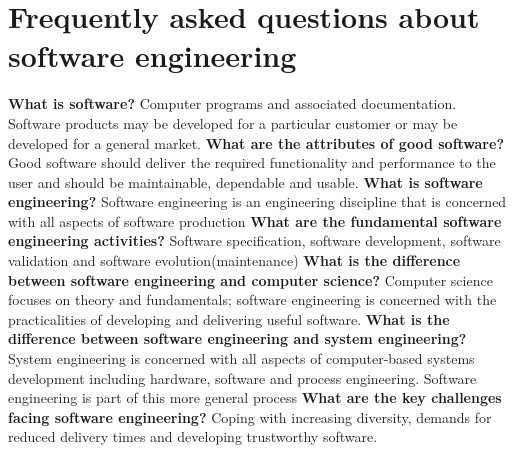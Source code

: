 \documentclass{report}
\begin{document}
\newpage
\section{Frequently asked questions about software engineering}
\textbf{What is software?}\newline
  Computer programs and associated documentation. Software products may be developed for a particular customer or may be developed for a general market.
\newline\newline
\textbf{What are the attributes of good software?}\newline
  Good software should deliver the required functionality and performance to the user and should be maintainable, dependable and usable.
\newline\newline
\textbf{What is software engineering?}\newline
Software engineering is an engineering discipline that is
concerned with all aspects of software production
\newline\newline
\textbf{What are the fundamental software engineering activities?}\newline
Software specification, software development, software
validation and software evolution(maintenance)
\newline\newline
\textbf{What is the difference between software engineering and computer science?}\newline
Computer science focuses on theory and fundamentals; software engineering is concerned with the practicalities of developing and delivering useful software.
\newline\newline
\textbf{What is the difference between software engineering and system engineering?}\newline
System engineering is concerned with all aspects of computer-based systems development including hardware, software and process engineering. Software engineering is part of this more general process
\newline\newline
\textbf{What are the key challenges facing software engineering?}\newline
Coping with increasing diversity, demands for reduced delivery times and developing trustworthy software.
\newline\newline
\end{document}
